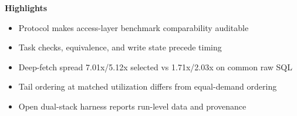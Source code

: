 \documentclass{article}
\begin{document}
\noindent\textbf{Highlights}
\begin{itemize}[leftmargin=1.5em,nosep]
  \item Protocol makes access-layer benchmark comparability auditable
  \item Task checks, equivalence, and write state precede timing
  \item Deep-fetch spread 7.01x/5.12x selected vs 1.71x/2.03x on common raw SQL
  \item Tail ordering at matched utilization differs from equal-demand ordering
  \item Open dual-stack harness reports run-level data and provenance
\end{itemize}
\end{document}
